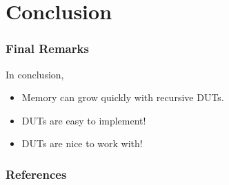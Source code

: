 \documentclass{beamer}
\begin{document}
\section{Conclusion}

\begin{frame}
 \frametitle{Final Remarks}
 In conclusion,
 \begin{itemize}
  \item<2-> Memory can grow quickly with recursive DUTs.
  \item<3-> DUTs are easy to implement!
  \item<4-> DUTs are nice to work with!
 \end{itemize}

\end{frame}


\begin{frame}
\frametitle{References}
\end{frame}
\end{document}
